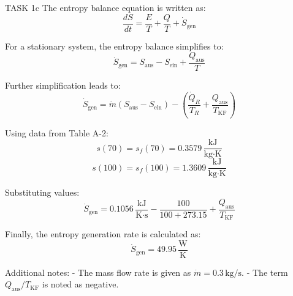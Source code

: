 TASK 1c  
The entropy balance equation is written as:  
\[
\frac{dS}{dt} = \frac{E}{T} + \frac{Q}{T} + \dot{S}_{\text{gen}}
\]  

For a stationary system, the entropy balance simplifies to:  
\[
\dot{S}_{\text{gen}} = S_{\text{aus}} - S_{\text{ein}} + \frac{Q_{\text{aus}}}{T}
\]  

Further simplification leads to:  
\[
\dot{S}_{\text{gen}} = \dot{m} \left( S_{\text{aus}} - S_{\text{ein}} \right) - \left( \frac{\dot{Q}_R}{T_R} + \frac{Q_{\text{aus}}}{T_{\text{KF}}} \right)
\]  

Using data from Table A-2:  
\[
s(70) = s_f(70) = 0.3579 \, \frac{\text{kJ}}{\text{kg·K}}
\]  
\[
s(100) = s_f(100) = 1.3609 \, \frac{\text{kJ}}{\text{kg·K}}
\]  

Substituting values:  
\[
\dot{S}_{\text{gen}} = 0.1056 \, \frac{\text{kJ}}{\text{K·s}} - \frac{100}{100 + 273.15} + \frac{Q_{\text{aus}}}{T_{\text{KF}}}
\]  

Finally, the entropy generation rate is calculated as:  
\[
\dot{S}_{\text{gen}} = 49.95 \, \frac{\text{W}}{\text{K}}
\]  

Additional notes:  
- The mass flow rate is given as \( \dot{m} = 0.3 \, \text{kg/s} \).  
- The term \( Q_{\text{aus}} / T_{\text{KF}} \) is noted as negative.
